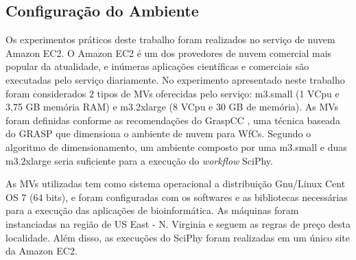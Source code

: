 \subsection{Configuração do Ambiente}

Os experimentos práticos deste trabalho foram realizados no serviço de nuvem Amazon EC2. O Amazon EC2 é um dos provedores de nuvem comercial mais popular da atualidade, e inúmeras aplicações científicas e comerciais são executadas pelo serviço diariamente. No experimento apresentado neste trabalho foram considerados 2 tipos de MVs oferecidas pelo serviço: m3.small (1 VCpu e 3,75 GB memória RAM) e m3.2xlarge (8 VCpu e 30 GB de memória). As MVs foram definidas conforme as recomendações do GraspCC \cite{Coutinho201551}, uma técnica baseada do GRASP que dimensiona o ambiente de nuvem para WfCs. Segundo o algoritmo de dimensionamento, um ambiente composto por uma m3.small e duas m3.2xlarge seria suficiente para a execução do \textit{workflow} SciPhy.



As MVs utilizadas tem como sistema operacional a distribuição Gnu/Linux Cent OS 7 (64 bits), e foram configuradas com os softwares e as bibliotecas necessárias para a execução das aplicações de bioinformática. As máquinas foram instanciadas na região de US East - N. Virginia e  seguem as regras de preço desta localidade. Além disso, as execuções do SciPhy foram realizadas em um único site da Amazon EC2. 


